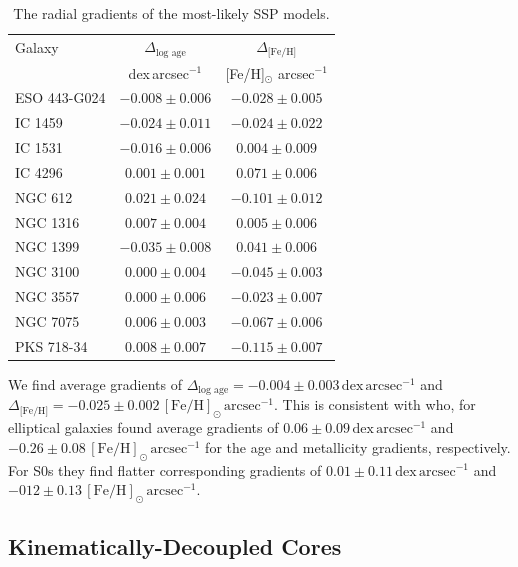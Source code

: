 			\begin{table}
				\centering
				\caption{The radial gradients of the most-likely SSP models.}
				\label{tab:popGrad}
				\begin{tabular}{l c c}
					\hline
					\hline 
					Galaxy 	& $\Delta_\text{log age}$ & $\Delta_\text{[Fe/H]}$ \\ 
						& dex\,arcsec$^{-1}$ & [Fe/H]$_\odot$ arcsec$^{-1}$ \\
					\hline
					ESO 443-G024 & $-0.008 \pm 0.006$ & $-0.028 \pm 0.005$ \\
					IC 1459 	& $-0.024 \pm 0.011$ & $-0.024 \pm 0.022$ \\
					IC 1531 	& $-0.016 \pm 0.006$ & $0.004 \pm 0.009$ \\
					IC 4296		& $0.001 \pm 0.001$ & $0.071 \pm 0.006$ \\
					NGC 612 	& $0.021 \pm 0.024$ & $-0.101 \pm 0.012$ \\
					NGC 1316 	& $0.007 \pm 0.004$ & $0.005 \pm 0.006$ \\
					NGC 1399 	& $-0.035 \pm 0.008$ & $0.041 \pm 0.006$ \\
					NGC 3100 	& $0.000 \pm 0.004$ & $-0.045 \pm 0.003$ \\
					NGC 3557 	& $0.000 \pm 0.006$ & $-0.023 \pm 0.007$ \\
					NGC 7075 	& $0.006 \pm 0.003$ & $-0.067 \pm 0.006$ \\
					PKS 718-34  & $0.008 \pm 0.007$ & $-0.115 \pm 0.007$ \\
					\hline
					\hline
				\end{tabular}
			\end{table}

			We find average gradients of $\Delta_\text{log age} = -0.004\pm0.003 \,\mathrm{dex \, arcsec^{-1}}$ and $\Delta_\text{[Fe/H]} = -0.025\pm0.002 \, \mathrm{[Fe/H]_\odot \, arcsec^{-1}}$. This is consistent with \citet{Koleva2011} who, for elliptical galaxies found average gradients of $0.06\pm0.09 \, \mathrm{dex \, arcsec^{-1}}$ and $-0.26\pm0.08 \, \mathrm{[Fe/H]_\odot \, arcsec^{-1}}$ for the age and metallicity gradients, respectively. For S0s they find flatter corresponding gradients of $0.01\pm0.11\, \mathrm{dex \, arcsec^{-1}}$ and $-012\pm0.13\, \mathrm{[Fe/H]_\odot \, arcsec^{-1}}$. 




	\subsection{Kinematically-Decoupled Cores}
		\label{subsec:popKDC}

